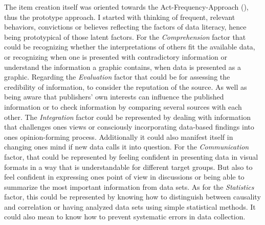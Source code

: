 \documentclass[
  12pt,
  a4paper,
  twoside]{article}
\begin{document}
The item creation itself was oriented towards the Act-Frequency-Approach (), thus the prototype approach.
I started with thinking of frequent, relevant behaviors, convictions or believes reflecting the factors of data literacy, hence being prototypical of those latent factors.
For the \emph{Comprehension} factor that could be recognizing whether the interpretations of others fit the available data, or recognizing when one is presented with contradictory information or understand the information a graphic contains, when data is presented as a graphic.
Regarding the \emph{Evaluation} factor that could be for assessing the credibility of information, to consider the reputation of the source. As well as being aware that publishers' own interests can influence the published information or to check information by comparing several sources with each other.
The \emph{Integration} factor could be represented by dealing with information that challenges ones views or consciously incorporating data-based findings into ones opinion-forming process. Additionally it could also manifest itself in changing ones mind if new data calls it into question.
For the \emph{Communication} factor, that could be represented by feeling confident in presenting data in visual formats in a way that is understandable for different target groups. But also to feel confident in expressing ones point of view in discussions or being able to summarize the most important information from data sets.
As for the \emph{Statistics} factor, this could be represented by knowing how to distinguish between causality and correlation or having analyzed data sets using simple statistical methods. It could also mean to know how to prevent systematic errors in data collection.
\end{document}
